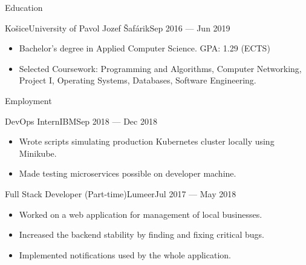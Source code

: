 \documentclass[]{style}
\begin{document}
	\makeheader
	
	\begin{cvsection}{Education}
		\begin{cvsubsection}{Košice}{University of Pavol Jozef Šafárik}{Sep 2016 — Jun 2019}
			\begin{itemize}
				\item Bachelor's degree in Applied Computer Science. GPA: 1.29 (ECTS)
				\item Selected Coursework: Programming and Algorithms, Computer Networking, Project I, Operating Systems, Databases, Software Engineering.
			\end{itemize}
		\end{cvsubsection}
	\end{cvsection}

	\begin{cvsection}{Employment}
    	\begin{cvsubsection}{DevOps Intern}{IBM}{Sep 2018 — Dec 2018}
			\begin{itemize}
			    \item Wrote scripts simulating production Kubernetes cluster locally using Minikube.
			    \item Made testing microservices possible on developer machine.
			\end{itemize}
		\end{cvsubsection}
		
		\begin{cvsubsection}{Full Stack Developer (Part-time)}{Lumeer}{Jul 2017 — May 2018}
			\begin{itemize}
				\item Worked on a web application for management of local businesses.
				\item Increased the backend stability by finding and fixing critical bugs.
				\item Implemented notifications used by the whole application.							
			\end{itemize}
		\end{cvsubsection}
	\end{cvsection}
	
\end{document}
